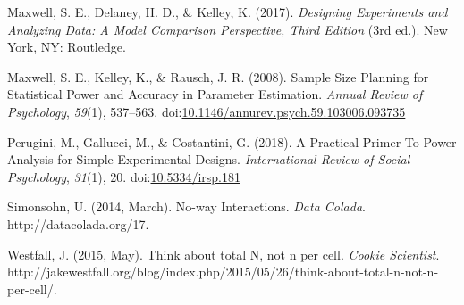 \documentclass[
  ,jou,floatsintext]{apa6}
\begin{document}
\leavevmode\hypertarget{ref-maxwell_designing_2017}{}%
Maxwell, S. E., Delaney, H. D., \& Kelley, K. (2017). \emph{Designing Experiments and Analyzing Data: A Model Comparison Perspective, Third Edition} (3rd ed.). New York, NY: Routledge.

\leavevmode\hypertarget{ref-maxwell_sample_2008}{}%
Maxwell, S. E., Kelley, K., \& Rausch, J. R. (2008). Sample Size Planning for Statistical Power and Accuracy in Parameter Estimation. \emph{Annual Review of Psychology}, \emph{59}(1), 537--563. doi:\href{https://doi.org/10.1146/annurev.psych.59.103006.093735}{10.1146/annurev.psych.59.103006.093735}

\leavevmode\hypertarget{ref-perugini_practical_2018}{}%
Perugini, M., Gallucci, M., \& Costantini, G. (2018). A Practical Primer To Power Analysis for Simple Experimental Designs. \emph{International Review of Social Psychology}, \emph{31}(1), 20. doi:\href{https://doi.org/10.5334/irsp.181}{10.5334/irsp.181}

\leavevmode\hypertarget{ref-simonsohn_no-way_2014}{}%
Simonsohn, U. (2014, March). No-way Interactions. \emph{Data Colada}. http://datacolada.org/17.

\leavevmode\hypertarget{ref-westfall_think_2015}{}%
Westfall, J. (2015, May). Think about total N, not n per cell. \emph{Cookie Scientist}. http://jakewestfall.org/blog/index.php/2015/05/26/think-about-total-n-not-n-per-cell/.
\end{document}
